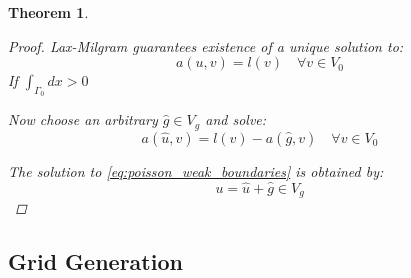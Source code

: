 \documentclass[11pt,a4paper]{article}
\newtheorem{theorem}{Theorem}[section]
\begin{document}
\begin{multicols}{2}
\begin{theorem}
\begin{proof}
        Lax-Milgram guarantees existence of a unique solution to:
        \begin{equation*}
          a(u,v) = l(v) \quad \forall v \in V_0
        \end{equation*}
        If $\int_{\Gamma_0}dx >0$

        Now choose an arbitrary $\hat{g}\in V_g$ and solve:
        \begin{equation*}
          a(\hat{u},v) = l(v) - a(\hat{g},v) \quad \forall v \in V_0
        \end{equation*}

        The solution to \ref{eq:poisson_weak_boundaries} is obtained by:
        $$u = \hat{u} + \hat{g} \in V_g$$

      \end{proof}

    \end{theorem}

  \subsection*{Grid Generation}

\end{multicols}
\end{document}
